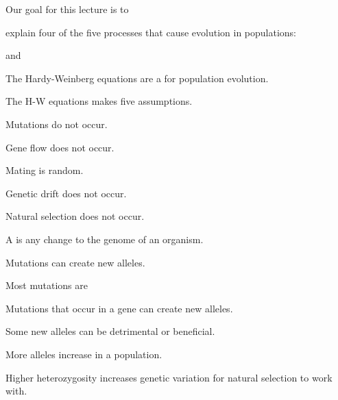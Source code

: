 \documentclass[t]{beamer}
\begin{document}
%
%
\begin{frame}{Our goal for this lecture is to }
	
	\hangpara explain four of the five processes that cause evolution in populations:
	
	\hangpara \quad {}

	\hangpara \quad {}
	 	 
	\hangpara \quad {} and
	
	\hangpara \quad {} 

\end{frame}
% 
\begin{frame}[t]{The Hardy-Weinberg equations are a  for population evolution.}
	
	\vspace{-\baselineskip}
	
	\hangpara The H-W equations makes five assumptions.
	
	\hangpara \quad Mutations do not occur.
		
	\hangpara \quad Gene flow does not occur.

	\hangpara \quad Mating is random.
	
	\hangpara \quad Genetic drift does not occur.
	
	\hangpara \quad Natural selection does not occur.
	
	\pause \hangpara {}
	
\end{frame}
%
{
\begin{frame}[t]{A  is any change to the genome of an organism.}

	\vfilll

	\hfill{}
\end{frame}
}
%
\begin{frame}[t]{Mutations can create new alleles.}

	\hangpara Most mutations are \pause
	
	\hangpara Mutations that occur in a gene can create new alleles.\pause
	
	\hangpara Some new alleles can be detrimental or beneficial.\pause

	\hangpara More alleles increase  in a population.\pause
	
	\hangpara Higher heterozygosity increases genetic variation for natural selection to work with.
	
\end{frame}
\end{document}
